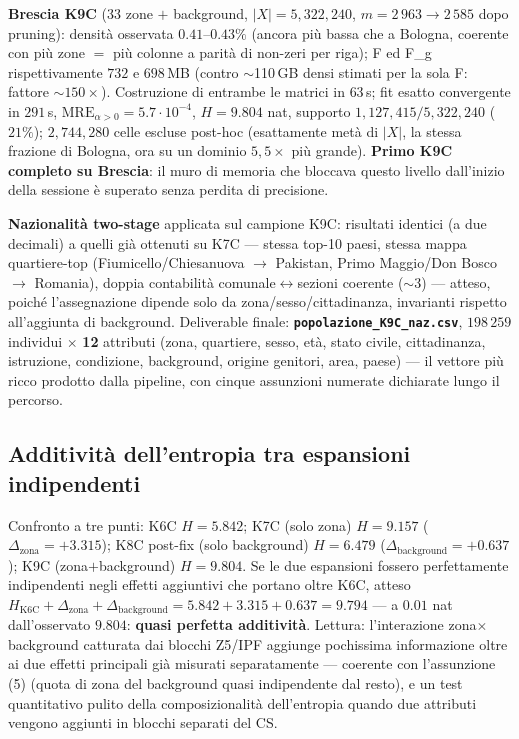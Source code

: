 \documentclass[11pt,a4paper]{article}
\newcommand{\code}[1]{\texttt{#1}}
\begin{document}
\medskip\noindent\textbf{Brescia K9C} ($33$ zone $+$ background,
$|X|=5{,}322{,}240$, $m=2\,963\to2\,585$ dopo pruning): densit\`a
osservata $0.41$--$0.43\%$ (ancora pi\`u bassa che a Bologna, coerente
con pi\`u zone $=$ pi\`u colonne a parit\`a di non-zeri per riga); F ed
F\_g rispettivamente $732$ e $698$\,MB (contro $\sim$110\,GB densi
stimati per la sola F: fattore $\sim150\times$). Costruzione di
entrambe le matrici in $63$\,s; fit esatto convergente in $291$\,s,
$\text{MRE}_{\alpha>0}=5.7\cdot10^{-4}$, $H=9.804$ nat, supporto
$1{,}127{,}415/5{,}322{,}240$ ($21\%$); $2{,}744{,}280$ celle escluse
post-hoc (esattamente met\`a di $|X|$, la stessa frazione di Bologna,
ora su un dominio $5{,}5\times$ pi\`u grande). \textbf{Primo K9C completo
su Brescia}: il muro di memoria che bloccava questo livello dall'inizio
della sessione \`e superato senza perdita di precisione.

\medskip\noindent\textbf{Nazionalit\`a two-stage} applicata sul campione
K9C: risultati identici (a due decimali) a quelli gi\`a ottenuti su K7C
--- stessa top-10 paesi, stessa mappa quartiere-top (Fiumicello/Chiesanuova
$\to$ Pakistan, Primo Maggio/Don Bosco $\to$ Romania), doppia contabilit\`a
comunale$\leftrightarrow$sezioni coerente ($\sim3$\textperthousand)
--- atteso, poich\'e l'assegnazione dipende solo da zona/sesso/cittadinanza,
invarianti rispetto all'aggiunta di background. Deliverable finale:
\textbf{\code{popolazione\_K9C\_naz.csv}}, $198\,259$ individui
$\times$ \textbf{12} attributi (zona, quartiere, sesso, et\`a, stato
civile, cittadinanza, istruzione, condizione, background, origine
genitori, area, paese) --- il vettore pi\`u ricco prodotto dalla
pipeline, con cinque assunzioni numerate dichiarate lungo il percorso.

\subsection{Additivit\`a dell'entropia tra espansioni indipendenti}
Confronto a tre punti: K6C $H=5.842$; K7C (solo zona) $H=9.157$
($\Delta_{\text{zona}}=+3.315$); K8C post-fix (solo background)
$H=6.479$ ($\Delta_{\text{background}}=+0.637$); K9C (zona$+$background)
$H=9.804$. Se le due espansioni fossero perfettamente indipendenti negli
effetti aggiuntivi che portano oltre K6C, atteso
$H_{\text{K6C}}+\Delta_{\text{zona}}+\Delta_{\text{background}}=
5.842+3.315+0.637=9.794$ --- a $0.01$ nat dall'osservato $9.804$:
\textbf{quasi perfetta additivit\`a}. Lettura: l'interazione
zona$\times$background catturata dai blocchi Z5/IPF aggiunge
pochissima informazione oltre ai due effetti principali gi\`a misurati
separatamente --- coerente con l'assunzione (5) (quota di zona del
background quasi indipendente dal resto), e un test quantitativo pulito
della composizionalit\`a dell'entropia quando due attributi vengono
aggiunti in blocchi separati del CS.
\end{document}
